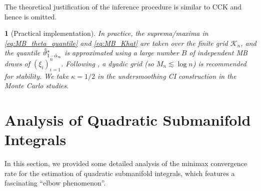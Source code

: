 \documentclass[12pt,american]{article}
\theoremstyle{definition}
\theoremstyle{plain}
\theoremstyle{definition}
\theoremstyle{plain}
\theoremstyle{plain}
\theoremstyle{plain}
\theoremstyle{plain}
\newtheorem{rem}{\protect\remarkname}
\theoremstyle{plain}
\providecommand{\remarkname}{Remark}
\begin{document}
The theoretical justification of the inference procedure is similar to CCK and hence is omitted.
    
\begin{rem}[Practical implementation]\label{rem:MB_practice}
  In practice, the suprema/maxima in \eqref{eq:MB_theta_quantile} and \eqref{eq:MB_Khat} are taken over the finite
  grid $\mathcal K_n$, and the quantile $\hat\vartheta_{1-\hat{\alpha}_n}^*$ is approximated using a large number $B$ of
  independent MB draws of $(\xi_i)_{i=1}^n$.
  Following \citet{chen2025adaptive}, a dyadic grid (so $M_n\lesssim \log n$) is recommended for stability. We take $\kappa =1/2$ in the undersmoothing CI construction in the Monte Carlo studies.
\end{rem}

\section{Analysis of Quadratic Submanifold Integrals}

In this section, we provided some detailed analysis of the minimax convergence rate for the estimation of quadratic submanifold integrals, which features a fascinating ``elbow phenomenon''.
\end{document}
